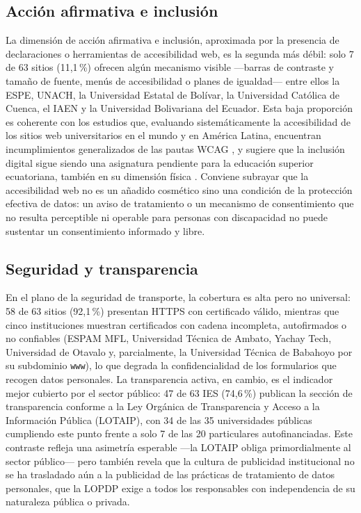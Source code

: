 \documentclass[11pt,a4paper]{article}
\begin{document}
\subsection{Acci\'on afirmativa e inclusi\'on}
La dimensi\'on de acci\'on afirmativa e inclusi\'on, aproximada por la presencia de declaraciones o herramientas de accesibilidad web, es la segunda m\'as d\'ebil: solo 7 de 63 sitios (11,1\,\%) ofrecen alg\'un mecanismo visible ---barras de contraste y tama\~no de fuente, men\'us de accesibilidad o planes de igualdad--- entre ellos la ESPE, UNACH, la Universidad Estatal de Bol\'ivar, la Universidad Cat\'olica de Cuenca, el IAEN y la Universidad Bolivariana del Ecuador.
Esta baja proporci\'on es coherente con los estudios que, evaluando sistem\'aticamente la accesibilidad de los sitios web universitarios en el mundo y en Am\'erica Latina, encuentran incumplimientos generalizados de las pautas WCAG \citep{campoverdemolina2023accessibility,acostavargas2020dataset,acostavargas2020improve}, y sugiere que la inclusi\'on digital sigue siendo una asignatura pendiente para la educaci\'on superior ecuatoriana, tambi\'en en su dimensi\'on f\'isica \citep{maldonadogarces2025physical}.
Conviene subrayar que la accesibilidad web no es un a\~nadido cosm\'etico sino una condici\'on de la protecci\'on efectiva de datos: un aviso de tratamiento o un mecanismo de consentimiento que no resulta perceptible ni operable para personas con discapacidad no puede sustentar un consentimiento informado y libre.

\subsection{Seguridad y transparencia}
En el plano de la seguridad de transporte, la cobertura es alta pero no universal: 58 de 63 sitios (92,1\,\%) presentan HTTPS con certificado v\'alido, mientras que cinco instituciones muestran certificados con cadena incompleta, autofirmados o no confiables (ESPAM MFL, Universidad T\'ecnica de Ambato, Yachay Tech, Universidad de Otavalo y, parcialmente, la Universidad T\'ecnica de Babahoyo por su subdominio \texttt{www}), lo que degrada la confidencialidad de los formularios que recogen datos personales.
La transparencia activa, en cambio, es el indicador mejor cubierto por el sector p\'ublico: 47 de 63 IES (74,6\,\%) publican la secci\'on de transparencia conforme a la Ley Org\'anica de Transparencia y Acceso a la Informaci\'on P\'ublica (LOTAIP), con 34 de las 35 universidades p\'ublicas cumpliendo este punto frente a solo 7 de las 20 particulares autofinanciadas.
Este contraste refleja una asimetr\'ia esperable ---la LOTAIP obliga primordialmente al sector p\'ublico--- pero tambi\'en revela que la cultura de publicidad institucional no se ha trasladado a\'un a la publicidad de las pr\'acticas de tratamiento de datos personales, que la LOPDP exige a todos los responsables con independencia de su naturaleza p\'ublica o privada.
\end{document}
